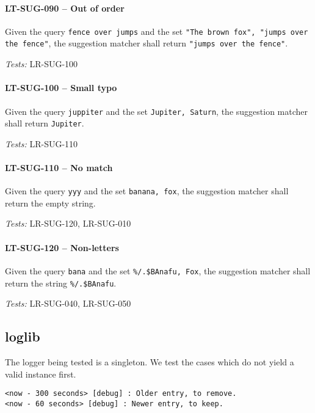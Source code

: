 \paragraph{LT-SUG-090 -- Out of order}
Given the query \lstinline{fence over jumps} and the set
\lstinline{"The brown fox", "jumps over the fence"}, the suggestion
matcher shall return \lstinline{"jumps over the fence"}.

\textit{Tests: } LR-SUG-100

\paragraph{LT-SUG-100 -- Small typo}
Given the query \lstinline{juppiter} and the set
\lstinline{Jupiter, Saturn}, the suggestion matcher shall return
\lstinline{Jupiter}.

\textit{Tests: } LR-SUG-110

\paragraph{LT-SUG-110 -- No match}
Given the query \lstinline{yyy} and the set
\lstinline{banana, fox}, the suggestion matcher shall return the
empty string.

\textit{Tests: } LR-SUG-120, LR-SUG-010

\paragraph{LT-SUG-120 -- Non-letters}
Given the query \lstinline{bana} and the set
\lstinline{%/.$BAnafu, Fox}, the suggestion matcher shall return
the string \lstinline{%/.$BAnafu}.

\textit{Tests: } LR-SUG-040, LR-SUG-050

\subsection{log\textunderscore lib}
The logger being tested is a singleton. We test the cases which do not
yield a valid instance first.

\begin{minipage}{\linewidth}
  \begin{lstlisting}[caption={Existing log file with old and new entries},
    label={lst:existing_log}]
<now - 300 seconds> [debug] : Older entry, to remove.
<now - 60 seconds> [debug] : Newer entry, to keep.
\end{lstlisting} \end{minipage}

